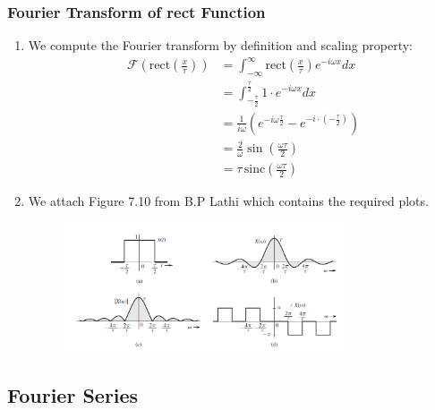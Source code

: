 \subsubsection{Fourier Transform of rect Function}
\begin{enumerate}
    \item We compute the Fourier transform by definition and scaling property:
    \begin{equation}
        \begin{aligned}
            \mathcal{F}\left(\text{rect}\left( \frac{x}{\tau} \right)\right) &= \int_{-\infty}^{\infty} \text{rect}\left( \frac{x}{\tau} \right) e^{-i \omega x} dx \\
            &= \int_{-\frac{\tau}{2}}^{\frac{\tau}{2}} 1 \cdot e^{- i \omega x} dx \\
            &= \frac{1}{ i \omega} \left( e^{- i \omega \frac{\tau}{2}} - e^{- i \cdot \left( -\frac{\tau}{2} \right)} \right) \\
            &= \frac{2}{\omega} \sin\left( \frac{\omega \tau}{2} \right) \\
            &= \tau \, \text{sinc} \left( \frac{\omega \tau}{2} \right)
        \end{aligned}
    \end{equation}

    \item We attach Figure 7.10 from B.P Lathi which contains the required plots.
    \begin{figure}[h]
        \centering
        \includegraphics[width=0.78\textwidth]{rec.png}
    \end{figure}

\end{enumerate}

\subsection{Fourier Series}

